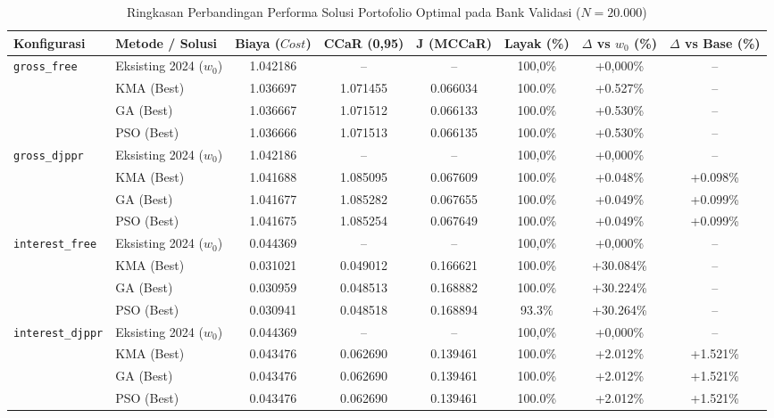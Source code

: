 \begin{table}[htbp]
\centering
\caption{Ringkasan Perbandingan Performa Solusi Portofolio Optimal pada Bank Validasi ($N=20.000$)}
\label{tab:results_summary}
\small
\begin{tabular}{llcccccc}
\toprule
\textbf{Konfigurasi} & \textbf{Metode / Solusi} & \textbf{Biaya ($Cost$)} & \textbf{CCaR (0,95)} & \textbf{J (MCCaR)} & \textbf{Layak (\%)} & \textbf{$\Delta$ vs $w_0$ (\%)} & \textbf{$\Delta$ vs Base (\%)} \\
\midrule
\multirow{4}{*}{\texttt{gross_free}} & Eksisting 2024 ($w_0$) & 1.042186 & -- & -- & 100{,}0\% & +0{,}000\% & -- \\
 & KMA (Best) & 1.036697 & 1.071455 & 0.066034 & 100.0\% & +0.527\% & -- \\
 & GA (Best) & 1.036667 & 1.071512 & 0.066133 & 100.0\% & +0.530\% & -- \\
 & PSO (Best) & 1.036666 & 1.071513 & 0.066135 & 100.0\% & +0.530\% & -- \\
\midrule
\multirow{4}{*}{\texttt{gross_djppr}} & Eksisting 2024 ($w_0$) & 1.042186 & -- & -- & 100{,}0\% & +0{,}000\% & -- \\
 & KMA (Best) & 1.041688 & 1.085095 & 0.067609 & 100.0\% & +0.048\% & +0.098\% \\
 & GA (Best) & 1.041677 & 1.085282 & 0.067655 & 100.0\% & +0.049\% & +0.099\% \\
 & PSO (Best) & 1.041675 & 1.085254 & 0.067649 & 100.0\% & +0.049\% & +0.099\% \\
\midrule
\multirow{4}{*}{\texttt{interest_free}} & Eksisting 2024 ($w_0$) & 0.044369 & -- & -- & 100{,}0\% & +0{,}000\% & -- \\
 & KMA (Best) & 0.031021 & 0.049012 & 0.166621 & 100.0\% & +30.084\% & -- \\
 & GA (Best) & 0.030959 & 0.048513 & 0.168882 & 100.0\% & +30.224\% & -- \\
 & PSO (Best) & 0.030941 & 0.048518 & 0.168894 & 93.3\% & +30.264\% & -- \\
\midrule
\multirow{4}{*}{\texttt{interest_djppr}} & Eksisting 2024 ($w_0$) & 0.044369 & -- & -- & 100{,}0\% & +0{,}000\% & -- \\
 & KMA (Best) & 0.043476 & 0.062690 & 0.139461 & 100.0\% & +2.012\% & +1.521\% \\
 & GA (Best) & 0.043476 & 0.062690 & 0.139461 & 100.0\% & +2.012\% & +1.521\% \\
 & PSO (Best) & 0.043476 & 0.062690 & 0.139461 & 100.0\% & +2.012\% & +1.521\% \\
\bottomrule
\end{tabular}
\end{table}